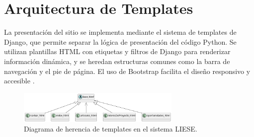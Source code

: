 \section{Arquitectura de Templates}
La presentación del sitio se implementa mediante el sistema de templates de Django, que permite separar la lógica de presentación del código Python. Se utilizan plantillas HTML con etiquetas y filtros de Django para renderizar información dinámica, y se heredan estructuras comunes como la barra de navegación y el pie de página. El uso de Bootstrap facilita el diseño responsivo y accesible \cite{bootstrap-docs}.

\begin{figure}[H]
	\centering
	\includegraphics[width=0.7\textwidth]{uml/templates-herencia.png}
	\caption{Diagrama de herencia de templates en el sistema LIESE.}
\end{figure}
